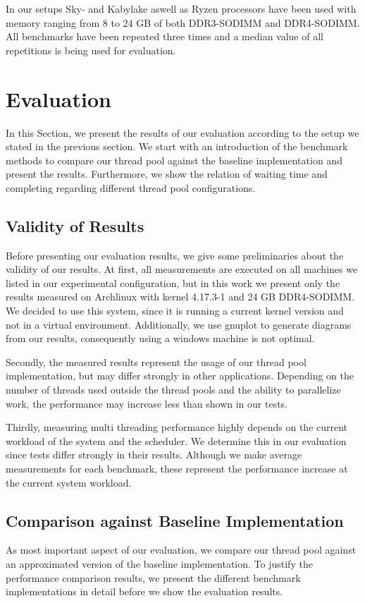 \documentclass[conference]{IEEEtran}
\begin{document}
In our setups Sky- and Kabylake aswell as Ryzen processors have been used with memory
ranging from 8 to 24 GB of both DDR3-SODIMM and DDR4-SODIMM. 
All benchmarks have been repeated three times and a median value of all
repetitions is being used for evaluation.

\section{Evaluation}
In this Section, we present the results of our evaluation according to the setup we stated in the previous section. We start with an introduction of the benchmark methods to compare our thread pool against the baseline implementation and present the results. Furthermore, we show the relation of waiting time and completing regarding different thread pool configurations.

\subsection{Validity of Results} 
Before presenting our evaluation results, we
give some preliminaries about the validity of our results. At first, all
measurements are executed on all machines we listed in our experimental
configuration, but in this work we present only the results measured on
Archlinux with kernel 4.17.3-1 and 24 GB DDR4-SODIMM. We decided to use this
system, since it is running a current kernel version and not in a virtual
environment. Additionally, we use gnuplot to generate diagrams from our results,
consequently using a windows machine is not optimal.

Secondly, the measured results represent the usage of our thread pool implementation, but may differ strongly in other applications. Depending on the number of threads used outside the thread pools and the ability to parallelize work, the performance may increase less than shown in our tests.

Thirdly, measuring multi threading performance highly depends on the current workload of the system and the scheduler. We determine this in our evaluation since tests differ strongly in their results. Although we make average measurements for each benchmark, these represent the performance increase at the current system workload.

\subsection{Comparison against Baseline Implementation}
As most important aspect of our evaluation, we compare our thread pool against an approximated version of the baseline implementation. To justify the performance comparison results, we present the different benchmark implementations in detail before we show the evaluation results.
\end{document}
